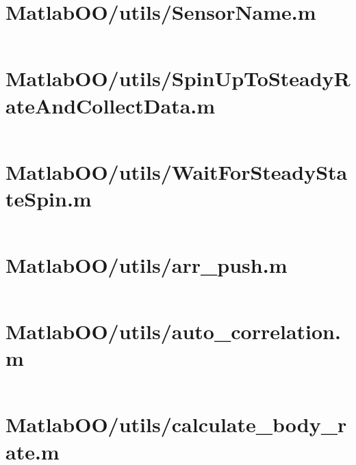 \pagebreak
\section*{MatlabOO/utils/SensorName.m}\label{code:MatlabOO/utils/SensorName.m}
\inputminted[linenos,fontsize=\scriptsize]{matlab}{/home/dcouture/git/mathyourlife/TSatPy/beta_versions/matlab_object_oriented/utils/SensorName.m}

\pagebreak
\section*{MatlabOO/utils/SpinUpToSteadyRateAndCollectData.m}\label{code:MatlabOO/utils/SpinUpToSteadyRateAndCollectData.m}
\inputminted[linenos,fontsize=\scriptsize]{matlab}{/home/dcouture/git/mathyourlife/TSatPy/beta_versions/matlab_object_oriented/utils/SpinUpToSteadyRateAndCollectData.m}

\pagebreak
\section*{MatlabOO/utils/WaitForSteadyStateSpin.m}\label{code:MatlabOO/utils/WaitForSteadyStateSpin.m}
\inputminted[linenos,fontsize=\scriptsize]{matlab}{/home/dcouture/git/mathyourlife/TSatPy/beta_versions/matlab_object_oriented/utils/WaitForSteadyStateSpin.m}

\pagebreak
\section*{MatlabOO/utils/arr\_push.m}\label{code:MatlabOO/utils/arr_push.m}
\inputminted[linenos,fontsize=\scriptsize]{matlab}{/home/dcouture/git/mathyourlife/TSatPy/beta_versions/matlab_object_oriented/utils/arr_push.m}

\pagebreak
\section*{MatlabOO/utils/auto\_correlation.m}\label{code:MatlabOO/utils/auto_correlation.m}
\inputminted[linenos,fontsize=\scriptsize]{matlab}{/home/dcouture/git/mathyourlife/TSatPy/beta_versions/matlab_object_oriented/utils/auto_correlation.m}

\pagebreak
\section*{MatlabOO/utils/calculate\_body\_rate.m}\label{code:MatlabOO/utils/calculate_body_rate.m}
\inputminted[linenos,fontsize=\scriptsize]{matlab}{/home/dcouture/git/mathyourlife/TSatPy/beta_versions/matlab_object_oriented/utils/calculate_body_rate.m}

